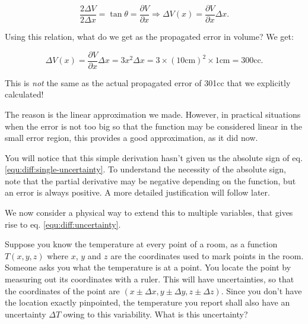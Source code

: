 \begin{equation}
\frac{2\Delta V}{2\Delta x}=\tan\theta=\frac{\partial V}{\partial x}\Rightarrow\Delta V(x)=\frac{\partial V}{\partial x}\Delta x.
\end{equation}


Using this relation, what do we get as the propagated error in volume?
We get:

\begin{equation}
\Delta V(x)=\frac{\partial V}{\partial x}\Delta x=3x^{2}\Delta x=3\times\left(10\textrm{cm}\right)^{2}\times1\textrm{cm}=300\textrm{cc}.
\end{equation}


This is \textit{not} the same as the actual propagated error of 301cc
that we explicitly calculated!

The reason is the linear approximation we made. However, in practical
situations when the error is not too big so that the function may
be considered linear in the small error region, this provides a good
approximation, as it did now.

You will notice that this simple derivation hasn't given us the absolute
sign of eq. \ref{equ:diff:single-uncertainty}. To understand the necessity of the absolute sign,
note that the partial derivative may be negative depending on the
function, but an error is always positive. A more detailed justification
will follow later.

We now consider a physical way to extend this to multiple variables,
that gives rise to eq. \ref{equ:diff:uncertainty}.

Suppose you know the temperature at every point of a room, as a function
$T(x,y,z)$ where $x$, $y$ and $z$ are the coordinates used to
mark points in the room. Someone asks you what the temperature is
at a point. You locate the point by measuring out its coordinates
with a ruler. This will have uncertainties, so that the coordinates
of the point are $(x\pm\Delta x,y\pm\Delta y,z\pm\Delta z)$. Since
you don't have the location exactly pinpointed, the temperature you
report shall also have an uncertainty $\Delta T$ owing to this variability.
What is this uncertainty?


